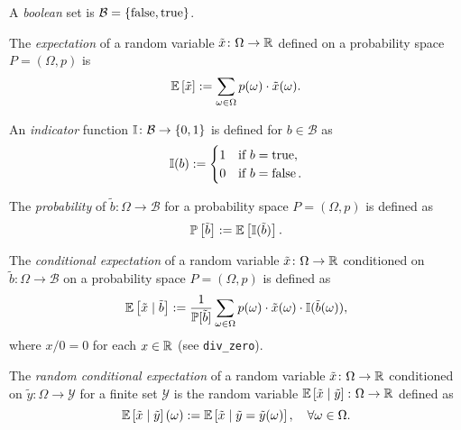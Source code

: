 \begin{definition}
A \emph{boolean} set is $\mathcal{B} = \left\{ \operatorname{false}, \operatorname{true} \right\}$.
 \leanok
\end{definition}

\begin{definition}
The \emph{expectation} of a random variable $\tilde{x} \colon \Omega \to \mathbb{R}$ defined on a probability space $P = (\Omega, p)$ is 
\[
\mathbb{E} \left[ \tilde{x} \right] := \sum_{\omega \in \Omega } p(\omega ) \cdot \tilde{x}(\omega).
\]
 \leanok
\end{definition}

\begin{definition}
An \emph{indicator} function $\mathbb{I} \colon \mathcal{B} \to \left\{ 0, 1 \right\}$ is defined for $b\in \mathcal{B}$ as
\[
\mathbb{I}(b) :=
\begin{cases}
1 &\text{if } b = \operatorname{true}, \\
0 &\text{if } b = \operatorname{false}.
\end{cases}
\]
 \leanok
\end{definition}

\begin{definition}
The \emph{probability} of $\tilde{b}\colon \Omega \to \mathcal{B}$ for a probability space $P = (\Omega, p)$ is defined as
\[
\mathbb{P} \left[ \tilde{b} \right] := \mathbb{E}\left[\mathbb{I}(\tilde{b})\right].
\]
\end{definition}

\begin{definition}
The \emph{conditional expectation} of a random variable $\tilde{x} \colon \Omega \to \mathbb{R}$ conditioned on $\tilde{b} \colon \Omega \to \mathcal{B}$ on a probability space $P = (\Omega, p)$ is defined as
\[
\mathbb{E} \left[ \tilde{x} \mid  \tilde{b} \right] :=
\frac{1}{\mathbb{P}[\tilde{b}]} \sum_{\omega \in \Omega } p(\omega ) \cdot \tilde{x}(\omega) \cdot \mathbb{I}(\tilde{b}(\omega)),
\]
where $x / 0 = 0$ for each $x\in \mathbb{R}$ (see \texttt{div\_zero}).
 \leanok
\end{definition}

\begin{definition}
The \emph{random conditional expectation} of a random variable $\tilde{x} \colon \Omega \to \mathbb{R}$ conditioned on $\tilde{y} \colon \Omega \to \mathcal{Y}$ for a finite set $\mathcal{Y}$ is the random variable $\mathbb{E} \left[ \tilde{x} \mid  \tilde{y} \right]\colon \Omega \to \mathbb{R}$  defined as
\[
\mathbb{E} \left[ \tilde{x} \mid  \tilde{y} \right](\omega)
:=
\mathbb{E} \left[ \tilde{x} \mid  \tilde{y} = \tilde{y}(\omega) \right], \quad \forall \omega \in \Omega.
\]
 \leanok
\end{definition}

